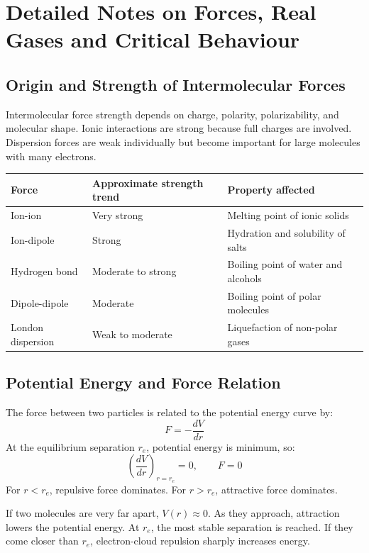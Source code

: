 \documentclass[12pt,a4paper]{article}
\begin{document}
\section{Detailed Notes on Forces, Real Gases and Critical Behaviour}

\subsection{Origin and Strength of Intermolecular Forces}
Intermolecular force strength depends on charge, polarity, polarizability, and molecular shape. Ionic interactions are strong because full charges are involved. Dispersion forces are weak individually but become important for large molecules with many electrons.

\begin{tabularx}{\linewidth}{|B{3.4cm}|Y|Y|}
\hline
\textbf{Force} & \textbf{Approximate strength trend} & \textbf{Property affected} \\
\hline
Ion-ion & Very strong & Melting point of ionic solids \\
\hline
Ion-dipole & Strong & Hydration and solubility of salts \\
\hline
Hydrogen bond & Moderate to strong & Boiling point of water and alcohols \\
\hline
Dipole-dipole & Moderate & Boiling point of polar molecules \\
\hline
London dispersion & Weak to moderate & Liquefaction of non-polar gases \\
\hline
\end{tabularx}

\subsection{Potential Energy and Force Relation}
The force between two particles is related to the potential energy curve by:
\[
F=-\frac{dV}{dr}
\]
At the equilibrium separation $r_e$, potential energy is minimum, so:
\[
\left(\frac{dV}{dr}\right)_{r=r_e}=0,\qquad F=0
\]
For $r<r_e$, repulsive force dominates. For $r>r_e$, attractive force dominates.

\begin{tcolorbox}[examplebox, title={Exam Interpretation of Potential Energy Curve}]
If two molecules are very far apart, $V(r)\approx0$. As they approach, attraction lowers the potential energy. At $r_e$, the most stable separation is reached. If they come closer than $r_e$, electron-cloud repulsion sharply increases energy.
\end{tcolorbox}
\end{document}
